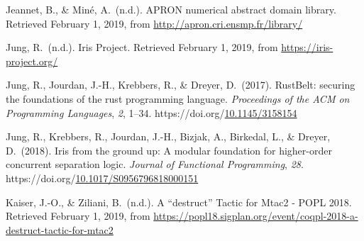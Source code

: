 \documentclass[12pt,twoside]{article}
\begin{document}
{\begin{thebibliography}{222}
Jeannet, B., \& Miné, A.~(n.d.). APRON numerical abstract domain library. Retrieved February 1, 2019, from \href{http://apron.cri.ensmp.fr/library/}{{\ttfamily http://\hspace{0pt}apron.\hspace{0pt}cri.\hspace{0pt}ensmp.\hspace{0pt}fr/\hspace{0pt}library/\hspace{0pt}}}\label{jeannet_apron_nodate}%

\mdbibitemlabel{[Jung, n.d.]}Jung, R.~(n.d.). Iris Project. Retrieved February 1, 2019, from \href{https://iris-project.org/}{{\ttfamily https://\hspace{0pt}iris-\hspace{0pt}project.\hspace{0pt}org/\hspace{0pt}}}\label{jung_iris_nodate}%

Jung, R., Jourdan, J.-H., Krebbers, R., \& Dreyer, D.~(2017). RustBelt: securing the foundations of the rust programming language. \emph{Proceedings of the ACM on Programming Languages}, \emph{2}, 1–34. https://doi.org/\href{https://dx.doi.org/10.1145/3158154}{10.1145/3158154}\label{jung_rustbelt:_2017}%

\mdbibitemlabel{[Jung et al., 2018]}Jung, R., Krebbers, R., Jourdan, J.-H., Bizjak, A., Birkedal, L., \& Dreyer, D.~(2018). Iris from the ground up: A modular foundation for higher-order concurrent separation logic. \emph{Journal of Functional Programming}, \emph{28}. https://doi.org/\href{https://dx.doi.org/10.1017/S0956796818000151}{10.1017/S0956796818000151}\label{jung_iris_2018}%

Kaiser, J.-O., \& Ziliani, B.~(n.d.). A \textquotedblleft{}destruct\textquotedblright{} Tactic for Mtac2 - POPL 2018. Retrieved February 1, 2019, from \href{https://popl18.sigplan.org/event/coqpl-2018-a-destruct-tactic-for-mtac2}{{\ttfamily https://\hspace{0pt}popl18.\hspace{0pt}sigplan.\hspace{0pt}org/\hspace{0pt}event/\hspace{0pt}coqpl-\hspace{0pt}2018-\hspace{0pt}a-\hspace{0pt}destruct-\hspace{0pt}tactic-\hspace{0pt}for-\hspace{0pt}mtac2}}\label{kaiser_destruct_nodate}%


\end{thebibliography}}
\end{document}
